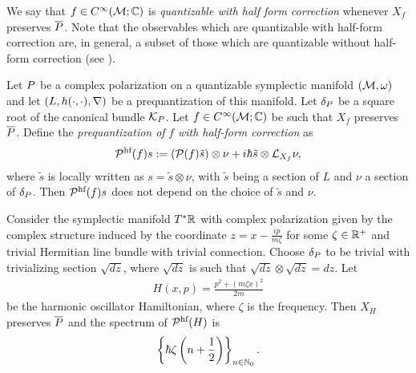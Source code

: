 \documentclass[notas.tex]{subfiles}
\begin{document}
We say that $f \in C^\infty(\mathcal{M}; \mathbb{C})$ is \emph{quantizable with half form correction} whenever $X_f$ preserves $\overline {P}$. Note that the observables which are quantizable with half-form correction are, in general, a subset of those which are quantizable without half-form correction (see ).
\begin{prop}
	Let $P$ be a complex polarization on a quantizable symplectic manifold $(\mathcal{M}, \omega)$ and let $(L, h(\cdot,\cdot), \nabla)$ be a prequantization of this manifold. Let $\delta_P$ be a square root of the canonical bundle $\mathcal{K}_P$. Let $f \in C^\infty(\mathcal{M}; \mathbb{C})$ be such that $X_f$ preserves $\overline {P}$. Define the \emph{prequantization of} $f$ \emph{with half-form correction} as
	\begin{align} \label{eq_prq_whf}
		\mathcal{\mathcal{P}^\text{hf}}(f) s := (\mathcal{P}(f) \tilde s)\otimes \nu + i \hbar \tilde s \otimes \mathcal{L}_{X_f}\nu,
	\end{align}
	where $\tilde s$ is locally written as $ s = \tilde s \otimes \nu$, with $\tilde s$ being a section of $L$ and $\nu$ a section of $\delta_P$. Then $\mathcal{\mathcal{P}^\text{hf}}(f) s$ does not depend on the choice of $\tilde s$ and $\nu$.
\end{prop}
\begin{ex}
	Consider the symplectic manifold $T^*\mathbb{R}$ with complex polarization given by the complex structure induced by the coordinate $z = x-\frac{ip}{m \zeta}$ for some $\zeta \in \mathbb{R}^+$ and trivial Hermitian line bundle with trivial connection. Choose $\delta_P$ to be trivial with trivializing section $\sqrt{dz}$, where $\sqrt{dz}$ is such that $\sqrt{dz} \otimes \sqrt{dz} = dz$. Let
	\begin{align*}
		H(x,p) = \frac{p^2 + (m \zeta x)^2}{2m}
	\end{align*}
	be the harmonic oscillator Hamiltonian, where $\zeta$ is the frequency. Then $X_H$ preserves $\overline {P}$ and the spectrum of $\mathcal{\mathcal{P}^\text{hf}}(H)$ is
	\begin{align*}
		\left \{\hbar \zeta \left( n + \frac{1}{2} \right) \right \}_{n \in \mathbb{N}_0}.
	\end{align*}
\end{ex}
\end{document}
